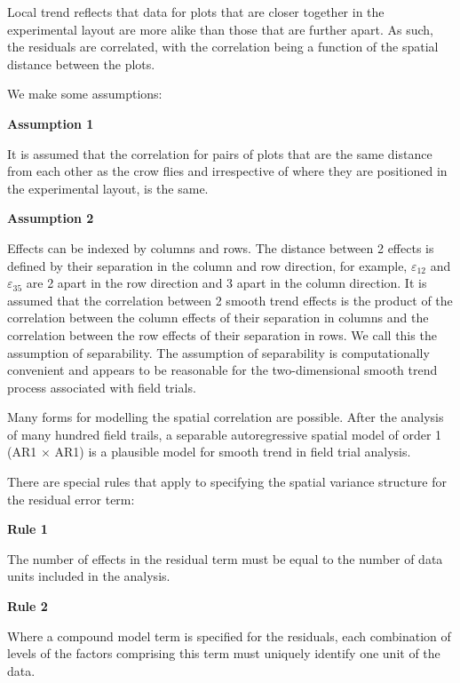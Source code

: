 \documentclass[a4paper, 10pt, fleqn, twosided]{memoir}
\begin{document}
Local trend reflects that data for plots that are closer together in the experimental layout are more alike than those
that are further apart. As such, the residuals are correlated, with the correlation being a function of the spatial
distance between the plots.

We make some assumptions:

\textbf{Assumption 1}



It is assumed that the correlation for pairs of plots that are the same distance from each other as the crow flies and
irrespective of where they are positioned in the experimental layout, is the same.



\textbf{Assumption 2}



Effects can be indexed by columns and rows. The distance between 2 effects is defined by their separation in the column
and row direction, for example, $\varepsilon_{12}$ and $\varepsilon_{35}$ are 2 apart in the row direction and 3 apart
in the column direction. It is assumed that the correlation between 2 smooth trend effects is the product of the
correlation between the column effects of their separation in columns and the correlation between the row effects of
their separation in rows. We call this the assumption of separability. The assumption of separability is
computationally convenient and appears to be reasonable for the two-dimensional smooth trend process associated with
field trials.




Many forms for modelling the spatial correlation are possible. After the analysis of many hundred field trails, a
separable autoregressive spatial model of order 1 (AR1 $\times$ AR1) is a plausible model for smooth trend in field
trial analysis.


\clearpage

There are special rules that apply to specifying the spatial variance structure for the residual error term:

\textbf{Rule 1}

The number of effects in the residual term must be equal to the number of data units included in the analysis.


\textbf{Rule 2}

Where a compound model term is specified for the residuals, each combination of levels of the factors comprising this
term must uniquely identify one unit of the data.
\end{document}
